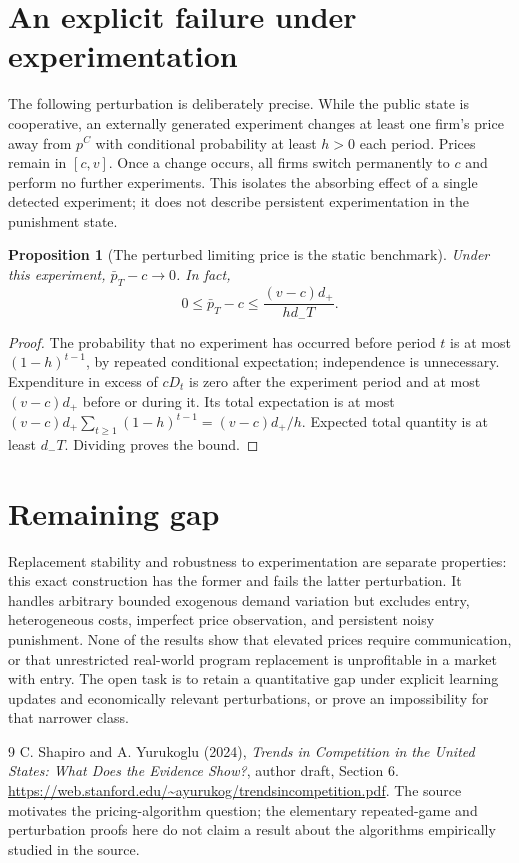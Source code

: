 \documentclass[11pt]{article}
\newtheorem{proposition}[theorem]{Proposition}
\theoremstyle{definition}
\theoremstyle{remark}
\begin{document}
\section{An explicit failure under experimentation}
The following perturbation is deliberately precise. While the public state is cooperative, an externally generated experiment changes at least one firm's price away from $p^C$ with conditional probability at least $h>0$ each period. Prices remain in $[c,v]$. Once a change occurs, all firms switch permanently to $c$ and perform no further experiments. This isolates the absorbing effect of a single detected experiment; it does not describe persistent experimentation in the punishment state.

\begin{proposition}[The perturbed limiting price is the static benchmark]
Under this experiment, $\bar p_T-c\longrightarrow0$. In fact,
\[
 0\le \bar p_T-c\le\frac{(v-c)d_+}{h d_-T}.
\]
\end{proposition}
\begin{proof}
The probability that no experiment has occurred before period $t$ is at most $(1-h)^{t-1}$, by repeated conditional expectation; independence is unnecessary. Expenditure in excess of $cD_t$ is zero after the experiment period and at most $(v-c)d_+$ before or during it. Its total expectation is at most $(v-c)d_+\sum_{t\ge1}(1-h)^{t-1}=(v-c)d_+/h$. Expected total quantity is at least $d_-T$. Dividing proves the bound.
\end{proof}

\section{Remaining gap}
Replacement stability and robustness to experimentation are separate properties: this exact construction has the former and fails the latter perturbation. It handles arbitrary bounded exogenous demand variation but excludes entry, heterogeneous costs, imperfect price observation, and persistent noisy punishment. None of the results show that elevated prices require communication, or that unrestricted real-world program replacement is unprofitable in a market with entry. The open task is to retain a quantitative gap under explicit learning updates and economically relevant perturbations, or prove an impossibility for that narrower class.

\begin{thebibliography}{9}
 C. Shapiro and A. Yurukoglu (2024), \emph{Trends in Competition in the United States: What Does the Evidence Show?}, author draft, Section 6. \url{https://web.stanford.edu/~ayurukog/trendsincompetition.pdf}. The source motivates the pricing-algorithm question; the elementary repeated-game and perturbation proofs here do not claim a result about the algorithms empirically studied in the source.
\end{thebibliography}
\end{document}
